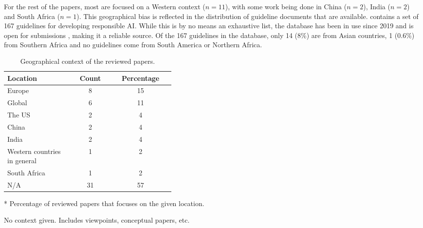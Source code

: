 For the rest of the papers, most are focused on a Western context ($n = 11$), with some work being done in China ($n = 2$), India ($n = 2$) and South Africa ($n = 1$). This geographical bias is reflected in the distribution of guideline documents that are available.
\textcite{AlgorithmWatch} contains a set of 167 guidelines for developing responsible AI. While this is by no means an exhaustive list, the database has been in use since 2019 and is open for submissions \parencite{AlgorithmWatch_about}, making it a reliable source. Of the 167 guidelines in the database, only 14 (8\%) are from Asian countries, 1 (0.6\%) from Southern Africa and no guidelines come from South America or Northern Africa.

\begin{table}[htpb]
    \centering
    \caption{Geographical context of the reviewed papers.}
    \label{tab:summary-context}
    \begin{threeparttable}
    \begin{tabular}{p{0.4\linewidth}cc}
    \toprule
        \textbf{Location} & \textbf{Count} & \textbf{Percentage}\tnote{*} \\
    \midrule
        Europe                          & 8     & 15 \\ 
        Global                          & 6     & 11 \\ 
        The US                          & 2     & 4 \\
        China                           & 2     & 4 \\ 
        India                           & 2     & 4 \\ 
        Western countries in general    & 1     & 2 \\ 
        South Africa                    & 1     & 2 \\
        N/A\tnote{\textdagger}          & 31    & 57 \\ 
    \bottomrule
    \end{tabular}
    \begin{tablenotes}
        \footnotesize
        \item [*] Percentage of reviewed papers that focuses on the given location.
        \item [\textdagger] No context given. Includes viewpoints, conceptual papers, etc.
    \end{tablenotes}
\end{threeparttable}
\end{table}

